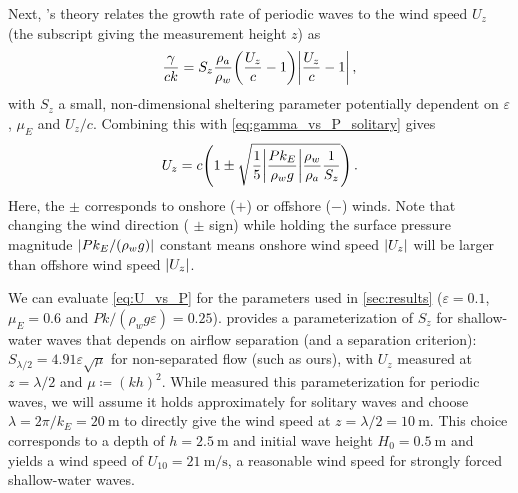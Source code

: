\documentclass{jfm}
\renewcommand*{\epsilon}{\varepsilon}
\begin{document}
Next, \citeauthor{jeffreys1925formation}'s
\citeyearpar{jeffreys1925formation} theory relates the growth rate of
periodic waves to the wind speed $U_z$ (the subscript giving the
measurement height $z$) as
\begin{equation}
  \frac{\gamma}{c k} = S_z \frac{\rho_a}{\rho_w}
    \pqty{\frac{U_z}{c}-1} \abs{\frac{U_z}{c}-1} \,,
  \label{eq:gamma_vs_u_jeffreys}
\end{equation}
with $S_z$ a small, non-dimensional sheltering parameter potentially
dependent on $\epsilon$, $\mu_E$ and $U_z/c$.
Combining this with \cref{eq:gamma_vs_P_solitary} gives
\begin{equation}
  U_z = c \pqty{1 \pm \sqrt{\frac{1}{5} \abs{\frac{P k_E}{\rho_w g}}
    \frac{\rho_w}{\rho_a} \frac{1}{S_z}}} \,.
  \label{eq:U_vs_P}
\end{equation}
Here, the $\pm$ corresponds to onshore ($+$) or offshore ($-$) winds.
Note that changing the wind direction (\ie{} $\pm$ sign) while holding
the surface pressure magnitude $\abs{Pk_E/(\rho_w g)}$ constant means
onshore wind speed $\abs{U_z}$ will be larger than offshore wind speed
$\abs{U_z}$.

We can evaluate \cref{eq:U_vs_P} for the parameters used in
\cref{sec:results} ($\epsilon=0.1$, $\mu_E = 0.6$ and $Pk/(\rho_w g
\epsilon) = 0.25$).
 provides a parameterization of $S_z$ for
shallow-water waves that depends on airflow separation (and a separation
criterion): $S_{\lambda/2} = 4.91 \epsilon \sqrt{\mu}$ for non-separated
flow (such as ours), with $U_z$ measured at $z=\lambda/2$ and $\mu
\coloneqq (kh)^2$.
While \citet{donelan2006wave} measured this parameterization for
periodic waves, we will assume it holds approximately for solitary waves
and choose $ \lambda = 2 \pi/k_E =
\SI{20}{\meter}$ to directly give the wind speed at $z = \lambda/2 =
\SI{10}{\meter}$.
This choice corresponds to a depth of $h = \SI{2.5}{\meter}$ and initial
wave height $H_0 = \SI{0.5}{\meter}$ and yields a wind speed of $U_{10}
= \SI{21}{\meter\per\second}$, a reasonable wind speed for strongly
forced shallow-water waves.
\end{document}
